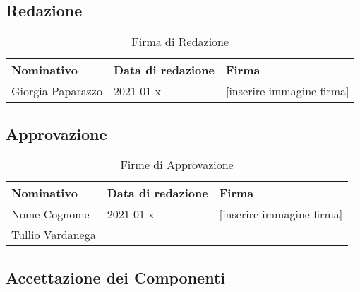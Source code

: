 \documentclass[../piano_di_progetto.tex]{subfiles}
\begin{document}
\subsection{Redazione}%
\label{sub:red}

\begin{center}
	\begin{table}[!h]
	\begin{tabular}{|l|l|l|}
		\hline
		\rowcolor{lightgray}
		\textbf{Nominativo} & \textbf{Data di redazione} & \textbf{Firma} \\ 

		\hline
			Giorgia Paparazzo & 2021-01-x &  [inserire immagine firma] \\
		\hline	

	\end{tabular}
		\caption{Firma di Redazione}
	\end{table}
\end{center}

\subsection{Approvazione}%
\label{sub:app}

\begin{center}
	\begin{table}[!h]
	\begin{tabular}{|l|l|l|}
		\hline
		\rowcolor{lightgray}
		\textbf{Nominativo} & \textbf{Data di redazione} & \textbf{Firma} \\ 

		\hline
			Nome Cognome & 2021-01-x &  [inserire immagine firma] \\
		\hline
			Tullio Vardanega & & \\
		\hline
	\end{tabular}
		\caption{Firme di Approvazione}
	\end{table}
\end{center}

\subsection{Accettazione dei Componenti}%
\label{sub:acc_comp}
\end{document}
